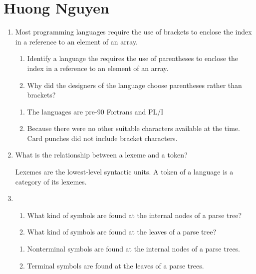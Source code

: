 
\chapter{Huong Nguyen}

\begin{enumerate}
  \item Most programming languages require the use of brackets to
    enclose the index in a reference to an element of an array.
  \begin{enumerate}
    \item Identify a language the requires the use of parentheses
      to enclose the index in a reference to an element of an array.
    \item Why did the designers of the language choose parentheses
      rather than brackets?
    \end{enumerate}

  \begin{answer}

  \begin{enumerate}
    \item The languages are pre-90 Fortrans and PL/I
    \item Because there were no other suitable characters available at
      the time. Card punches did not include bracket characters.
    \end{enumerate}

    \end{answer}
    
  \item What is the relationship between a lexeme and a token?

  \begin{answer}

    Lexemes are the lowest-level syntactic units. A token of a
    language is a category of its lexemes.

    \end{answer}

  \item
  \begin{enumerate}
    \item What kind of symbols are found at the internal nodes of a
      parse tree?
    \item What kind of symbols are found at the leaves of a parse tree?
    \end{enumerate}

  \begin{answer}

  \begin{enumerate}
    \item Nonterminal symbols are found at the internal nodes of a parse trees.
    \item Terminal symbols are found at the leaves of a parse trees.
    \end{enumerate}


\end{answer}
\end{enumerate}
